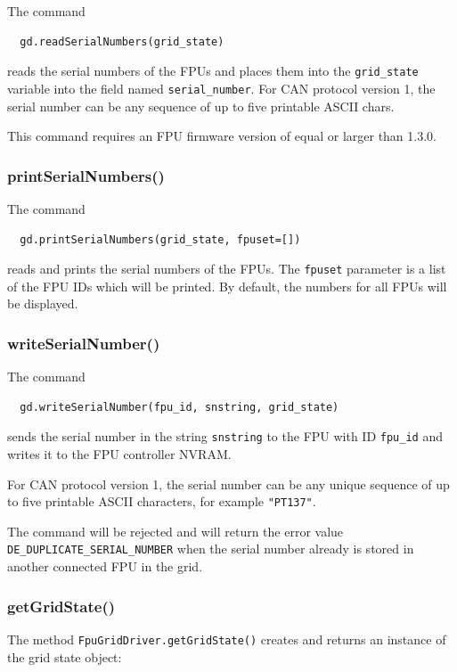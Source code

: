 \documentclass[11pt,a4paper]{report}
\begin{document}
The command
\begin{verbatim}
  gd.readSerialNumbers(grid_state)
\end{verbatim}
reads the serial numbers of the FPUs and places them into the
\texttt{grid\_state} variable into the field named
\texttt{serial\_number}. For CAN protocol version 1, the serial number
can be any sequence of up to five printable ASCII chars.

This command requires an FPU firmware version of equal or larger than
1.3.0.

\subsubsection{printSerialNumbers()}

The command
\begin{verbatim}
  gd.printSerialNumbers(grid_state, fpuset=[])
\end{verbatim}
reads and prints the serial numbers of the FPUs.  The \texttt{fpuset}
parameter is a list of the FPU IDs which will be printed. By default,
the numbers for all FPUs will be displayed.


\subsubsection{writeSerialNumber()}

The command
\begin{verbatim}
  gd.writeSerialNumber(fpu_id, snstring, grid_state)
\end{verbatim}
sends the serial number in the string \texttt{snstring}
to the FPU with ID \texttt{fpu\_id} and writes it
to the FPU controller NVRAM.

For CAN protocol version 1, the serial number can be any unique
sequence of up to five printable ASCII characters, for example
\texttt{"PT137"}.

\begin{sloppypar}
 The command will be rejected and
will return the error value \texttt{DE\_DUPLICATE\_SERIAL\_NUMBER}
when the serial number already is stored in another connected FPU in
the grid.
\end{sloppypar}



\subsubsection{getGridState()}
The method \texttt{FpuGridDriver.getGridState()} creates and returns
an instance of the grid state object:
\end{document}
